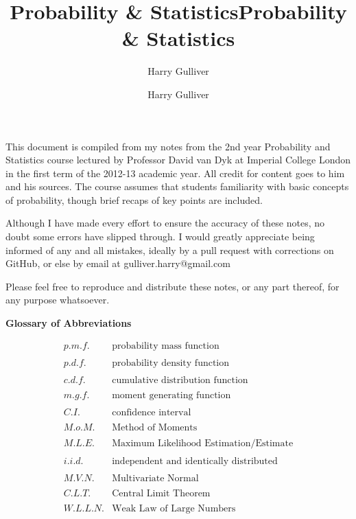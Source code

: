 \documentclass[12pt,a4paper]{article}
\title{Probability \& Statistics}
\author{Harry Gulliver}
\date{}
\title{Probability \& Statistics}
\author{Harry Gulliver}
\begin{document}
\maketitle
{}
\pagestyle{fancyplain}

\cfoot{\thepage}



This document is compiled from my notes from the 2nd year Probability and Statistics course lectured by Professor David van Dyk at Imperial College London in the first term of the 2012-13 academic year. All credit for content goes to him and his sources. The course assumes that students familiarity with basic concepts of probability, though brief recaps of key points are included.

Although I have made every effort to ensure the accuracy of these notes, no doubt some errors have slipped through. I would greatly appreciate being informed of any and all mistakes, ideally by a pull request with corrections on GitHub, or else by email at gulliver.harry@gmail.com

Please feel free to reproduce and distribute these notes, or any part thereof, for any purpose whatsoever.






\tableofcontents
\vspace{50pt}

{\Large\bf Glossary of Abbreviations}  %
\vspace{12pt}

$$\begin{array}{lr}
p.m.f. & \mbox{probability mass function}\\
 & \\
p.d.f. & \mbox{probability density function}\\
 & \\
c.d.f. & \mbox{cumulative distribution function}\\
 & \\
m.g.f. & \mbox{moment generating function}\\
 & \\
C.I. & \mbox{confidence interval}\\
 & \\
M.o.M. & \mbox{Method of Moments}\\
 & \\
M.L.E. & \mbox{Maximum Likelihood Estimation/Estimate}\\
 & \\
i.i.d. & \mbox{independent and identically distributed}\\
 & \\
M.V.N. & \mbox{Multivariate Normal}\\
 & \\
C.L.T. & \mbox{Central Limit Theorem}\\
 & \\
W.L.L.N. & \mbox{Weak Law of Large Numbers}
\end{array}$$
\end{document}
